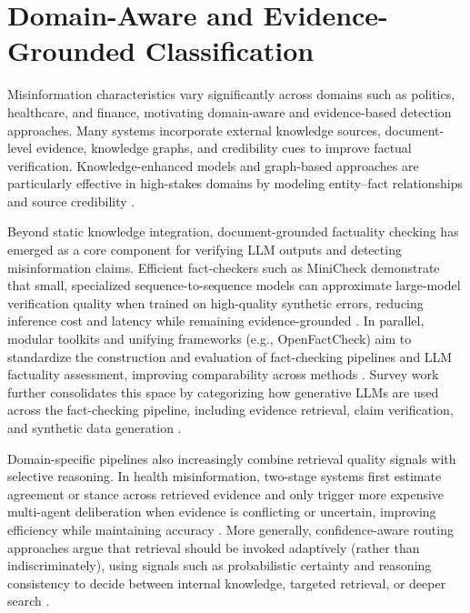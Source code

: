 \section{Domain-Aware and Evidence-Grounded Classification} 

Misinformation characteristics vary significantly across domains such as politics, healthcare, and finance, motivating domain-aware and evidence-based detection approaches. Many systems incorporate external knowledge sources, document-level evidence, knowledge graphs, and credibility cues to improve factual verification. Knowledge-enhanced models and graph-based approaches are particularly effective in high-stakes domains by modeling entity--fact relationships and source credibility \cite{10.1145/3728725.3728739}. 

Beyond static knowledge integration, document-grounded factuality checking has emerged as a core component for verifying LLM outputs and detecting misinformation claims. Efficient fact-checkers such as MiniCheck demonstrate that small, specialized sequence-to-sequence models can approximate large-model verification quality when trained on high-quality synthetic errors, reducing inference cost and latency while remaining evidence-grounded \cite{tang-etal-2024-minicheck}. In parallel, modular toolkits and unifying frameworks (e.g., OpenFactCheck) aim to standardize the construction and evaluation of fact-checking pipelines and LLM factuality assessment, improving comparability across methods \cite{wang2025openfactcheckbuildingbenchmarkingcustomized}. Survey work further consolidates this space by categorizing how generative LLMs are used across the fact-checking pipeline, including evidence retrieval, claim verification, and synthetic data generation \cite{vykopal2024generativelargelanguagemodels}. 

Domain-specific pipelines also increasingly combine retrieval quality signals with selective reasoning. In health misinformation, two-stage systems first estimate agreement or stance across retrieved evidence and only trigger more expensive multi-agent deliberation when evidence is conflicting or uncertain, improving efficiency while maintaining accuracy \cite{chen2025exploringhealthmisinformationdetection}. More generally, confidence-aware routing approaches argue that retrieval should be invoked adaptively (rather than indiscriminately), using signals such as probabilistic certainty and reasoning consistency to decide between internal knowledge, targeted retrieval, or deeper search \cite{wang2026factcheckinglargelanguagemodels}. 

